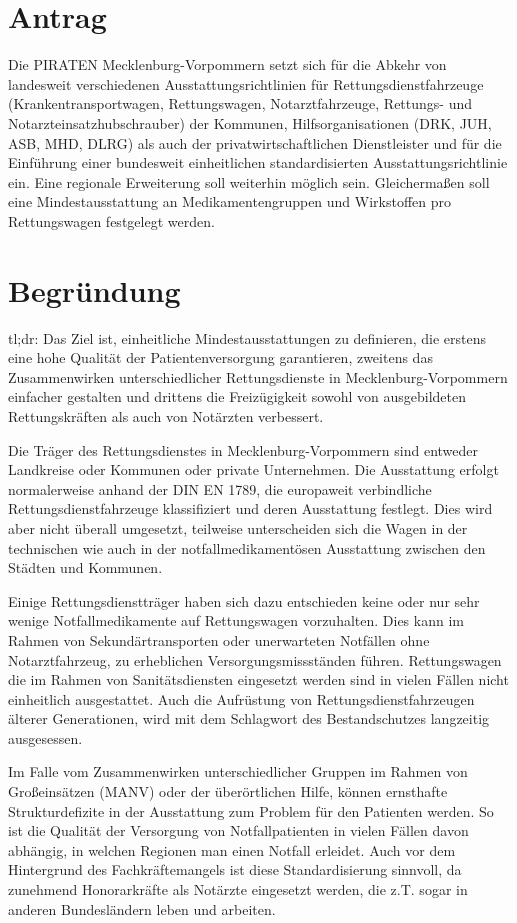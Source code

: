 \section{Antrag}

Die PIRATEN Mecklenburg-Vorpommern setzt sich für die Abkehr von landesweit verschiedenen Ausstattungsrichtlinien für Rettungsdienstfahrzeuge (Krankentransportwagen, Rettungswagen, Notarztfahrzeuge, Rettungs- und Notarzteinsatzhubschrauber) der Kommunen, Hilfsorganisationen (DRK, JUH, ASB, MHD, DLRG) als auch der privatwirtschaftlichen Dienstleister und für die Einführung einer bundesweit einheitlichen standardisierten Ausstattungsrichtlinie ein. Eine regionale Erweiterung soll weiterhin möglich sein. Gleichermaßen soll eine Mindestausstattung an Medikamentengruppen und Wirkstoffen pro Rettungswagen festgelegt werden.

\section{Begründung}

tl;dr: Das Ziel ist, einheitliche Mindestausstattungen zu definieren, die erstens eine hohe Qualität der Patientenversorgung garantieren, zweitens das Zusammenwirken unterschiedlicher Rettungsdienste in Mecklenburg-Vorpommern einfacher gestalten und drittens die Freizügigkeit sowohl von ausgebildeten Rettungskräften als auch von Notärzten verbessert.

Die Träger des Rettungsdienstes in Mecklenburg-Vorpommern sind entweder Landkreise oder Kommunen oder private Unternehmen. Die Ausstattung erfolgt normalerweise anhand der DIN EN 1789, die europaweit verbindliche Rettungsdienstfahrzeuge klassifiziert und deren Ausstattung festlegt. Dies wird aber nicht überall umgesetzt, teilweise unterscheiden sich die Wagen in der technischen wie auch in der notfallmedikamentösen Ausstattung zwischen den Städten und Kommunen.

Einige Rettungsdienstträger haben sich dazu entschieden keine oder nur sehr wenige Notfallmedikamente auf Rettungswagen vorzuhalten. Dies kann im Rahmen von Sekundärtransporten oder unerwarteten Notfällen ohne Notarztfahrzeug, zu erheblichen Versorgungsmissständen führen. Rettungswagen die im Rahmen von Sanitätsdiensten eingesetzt werden sind in vielen Fällen nicht einheitlich ausgestattet. Auch die Aufrüstung von Rettungsdienstfahrzeugen älterer Generationen, wird mit dem Schlagwort des Bestandschutzes langzeitig ausgesessen.

Im Falle vom Zusammenwirken unterschiedlicher Gruppen im Rahmen von Großeinsätzen (MANV) oder der überörtlichen Hilfe, können ernsthafte Strukturdefizite in der Ausstattung zum Problem für den Patienten werden. So ist die Qualität der Versorgung von Notfallpatienten in vielen Fällen davon abhängig, in welchen Regionen man einen Notfall erleidet. Auch vor dem Hintergrund des Fachkräftemangels ist diese Standardisierung sinnvoll, da zunehmend Honorarkräfte als Notärzte eingesetzt werden, die z.T. sogar in anderen Bundesländern leben und arbeiten.

